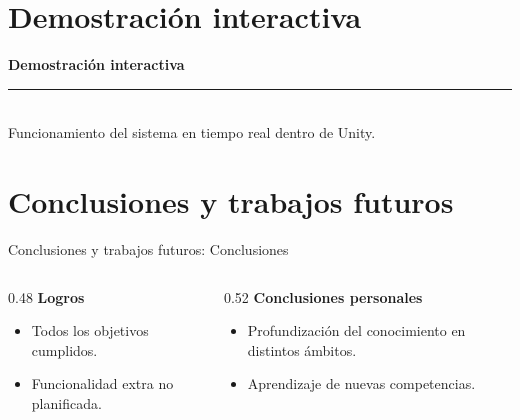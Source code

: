 \documentclass[aspectratio=169,11pt,xcolor=table]{beamer}
\newcommand{\apartadoMemoria}{}
\renewcommand{\apartadoMemoria}{}%
\begin{document}
\section{Demostración interactiva}
\begin{frame}[plain]
  \centering
  \vfill
  {\color{udcpink}\bfseries\Huge Demostración interactiva}\\[0.5em]
  {\color{udcpink}\rule{0.7\textwidth}{0.5mm}}\\[1.2em]
  {\Large Funcionamiento del sistema en tiempo real dentro de Unity.}
  \vfill
\end{frame}
\section{Conclusiones y trabajos futuros}


\renewcommand{\apartadoMemoria}{66-68}
\begin{frame}{Conclusiones y trabajos futuros: Conclusiones}
  \vspace{1.5em}
  \begin{columns}[T]
    \begin{column}{0.48\textwidth}
      \textbf{Logros}
      \vspace{0.8em}
      \begin{itemize}
        \setlength{\itemsep}{1.6em}
        \item Todos los objetivos cumplidos.
        \item Funcionalidad extra no planificada.
      \end{itemize}
    \end{column}
    \begin{column}{0.52\textwidth}
      \textbf{Conclusiones personales}
      \vspace{0.8em}
      \begin{itemize}
        \setlength{\itemsep}{1.6em}
        \item Profundización del conocimiento en distintos ámbitos.
        \item Aprendizaje de nuevas competencias.
      \end{itemize}
    \end{column}
  \end{columns}
\end{frame}
\renewcommand{\apartadoMemoria}{}
\end{document}
